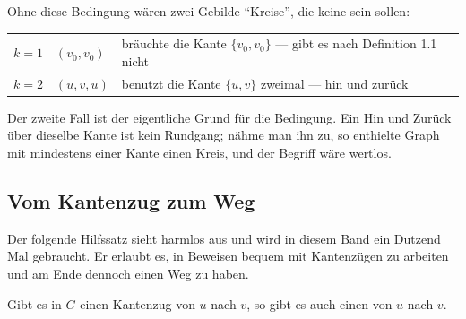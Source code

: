 \begin{warnung}
Ohne diese Bedingung wären zwei Gebilde \enquote{Kreise}, die keine sein sollen:

\begin{center}
\renewcommand{\arraystretch}{1.5}
\begin{tabular}{@{}P{1.5cm}P{2.6cm}P{4.2cm}@{}}
\toprule
$k = 1$ & $(v_0, v_0)$ & bräuchte die Kante $\{v_0,v_0\}$ --- gibt es nach Definition 1.1 nicht\\
$k = 2$ & $(u, v, u)$ & benutzt die Kante $\{u,v\}$ zweimal --- hin und zurück\\
\bottomrule
\end{tabular}
\end{center}

Der zweite Fall ist der eigentliche Grund für die Bedingung. Ein Hin und Zurück über dieselbe Kante ist kein Rundgang; nähme man ihn zu, so enthielte  Graph mit mindestens einer Kante einen Kreis, und der Begriff wäre wertlos.

\begin{center}
\begin{minipage}{0.88\textwidth}
\end{minipage}
\end{center}
\end{warnung}

\subsection*{Vom Kantenzug zum Weg}

Der folgende Hilfssatz sieht harmlos aus und wird in diesem Band ein Dutzend Mal gebraucht. Er erlaubt es, in Beweisen bequem mit Kantenzügen zu arbeiten und am Ende dennoch einen Weg zu haben.

\begin{merksatz}
Gibt es in $G$ einen Kantenzug von $u$ nach $v$, so gibt es auch einen  von $u$ nach $v$.
\end{merksatz}

